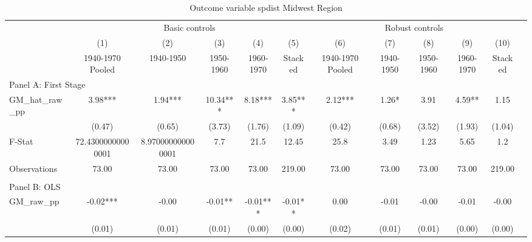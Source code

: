  \begin{table}[htbp]\centering {} \begin{threeparttable} \caption{Outcome variable spdist Midwest Region} \begin{tabular}{l*{11}{c}} \toprule
          &\multicolumn{5}{c}{Basic controls}                                   &\multicolumn{5}{c}{Robust controls}                                  \\\cmidrule(lr){2-6}\cmidrule(lr){7-11}
          &\multicolumn{1}{c}{(1)}&\multicolumn{1}{c}{(2)}&\multicolumn{1}{c}{(3)}&\multicolumn{1}{c}{(4)}&\multicolumn{1}{c}{(5)}&\multicolumn{1}{c}{(6)}&\multicolumn{1}{c}{(7)}&\multicolumn{1}{c}{(8)}&\multicolumn{1}{c}{(9)}&\multicolumn{1}{c}{(10)}\\
          &\multicolumn{1}{c}{1940-1970 Pooled}&\multicolumn{1}{c}{1940-1950}&\multicolumn{1}{c}{1950-1960}&\multicolumn{1}{c}{1960-1970}&\multicolumn{1}{c}{Stacked}&\multicolumn{1}{c}{1940-1970 Pooled}&\multicolumn{1}{c}{1940-1950}&\multicolumn{1}{c}{1950-1960}&\multicolumn{1}{c}{1960-1970}&\multicolumn{1}{c}{Stacked}\\
\cmidrule(lr){1-11}
\multicolumn{10}{l}{Panel A: First Stage}\\
\cmidrule(lr){1-11}
GM\_hat\_raw\_pp&      3.98***&      1.94***&     10.34***&      8.18***&      3.85***&      2.12***&      1.26*  &      3.91   &      4.59** &      1.15   \\
          &    (0.47)   &    (0.65)   &    (3.73)   &    (1.76)   &    (1.09)   &    (0.42)   &    (0.68)   &    (3.52)   &    (1.93)   &    (1.04)   \\
\midrule
F-Stat    &72.43000000000001   &8.970000000000001   &       7.7   &      21.5   &     12.45   &      25.8   &      3.49   &      1.23   &      5.65   &       1.2   \\
Observations&     73.00   &     73.00   &     73.00   &     73.00   &    219.00   &     73.00   &     73.00   &     73.00   &     73.00   &    219.00   \\
\cmidrule[\heavyrulewidth](lr){1-11} \\ \cmidrule[\heavyrulewidth](lr){1-11}
\multicolumn{10}{l}{Panel B: OLS}\\
\cmidrule(lr){1-11}
GM\_raw\_pp &     -0.02***&     -0.00   &     -0.01** &     -0.01***&     -0.01** &      0.00   &     -0.01   &     -0.00   &     -0.01   &     -0.00   \\
          &    (0.01)   &    (0.01)   &    (0.01)   &    (0.00)   &    (0.00)   &    (0.02)   &    (0.01)   &    (0.01)   &    (0.00)   &    (0.00)   \\

\end{tabular}
\end{threeparttable}
\end{table}
